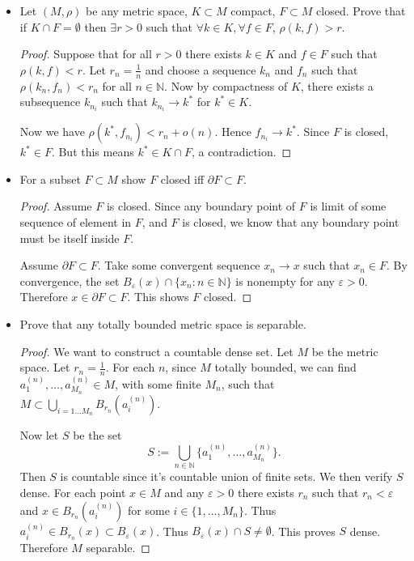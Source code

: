 \begin{itemize}
\item Let $(M, \rho)$ be any metric space, $K \subset M$ compact, $F \subset M$ closed. Prove that if $K \cap F = \emptyset $ then $\exists  r > 0$ such that  $\forall k \in K, \forall f \in F$, $\rho(k, f) > r$.
\begin{proof}
	Suppose that for all $r > 0$ there exists $k \in K$ and $f \in F$ such that $\rho(k, f) < r$. Let $r_n = \frac{1}{n}$ and choose a sequence $k_n$ and $f_n$ such that $\rho(k_n, f_n) < r_n$ for all $n \in \mathbb{N}$. Now by compactness of $K$, there exists a subsequence $k_{n_i}$ such that $k_{n_i} \to k^*$ for $k^* \in K$. 
 
	Now we have $\rho(k^*, f_{n_i}) < r_n + o(n)$. Hence $f_{n_i} \to  k^*$. Since $F$ is closed, $k^* \in F$. But this means  $k^* \in K \cap F$, a contradiction.
\end{proof}
\item For a subset $F \subset M$ show $F$ closed iff $\partial F \subset F$.
\begin{proof}
	Assume $F$ is closed. Since any boundary point of $F$ is limit of some sequence of element in $F$, and $F$ is closed, we know that any boundary point must be itself inside $F$.

	Assume $\partial F \subset F$. Take some convergent sequence $x_n \to x$ such that $x_n \in F$. By convergence, the set $B_\varepsilon(x) \cap \{x_n : n \in \mathbb{N}\} $ is nonempty for any $\varepsilon >0$. Therefore $x \in \partial F \subset F$. This shows $F$ closed.
\end{proof}
\item Prove that any totally bounded metric space is separable.
\begin{proof}
	We want to construct a countable dense set. Let $M$ be the metric space. Let $r_n = \frac{1}{n}$. For each $n$, since $M$ totally bounded, we can find $a^{(n)}_{1}, \ldots, a^{(n)}_{M_n} \in M$, with some finite $M_n$, such that  $M \subset \bigcup_{i = 1 \ldots M_n} B_{r_n}(a^{(n)}_i)$. 

	Now let $S$ be the set
	\[
		S := \bigcup_{n \in \mathbb{N}} \{a^{(n)}_1, \ldots, a^{(n)}_{M_n}\}   
	.\] 
	Then $S$ is countable since it's countable union of finite sets. We then verify $S$ dense. For each point $x \in M$ and any $\varepsilon >0$ there exists $r_n$ such that $r_n < \varepsilon$ and $x \in B_{r_n}(a^{(n)}_i)$ for some $i \in \{1, \ldots, M_n\} $. Thus $a^{(n)}_i \in B_{r_n}(x) \subset B_\varepsilon(x)$. Thus $B_\varepsilon(x) \cap  S \neq \emptyset $. This proves $S$ dense. Therefore $M$ separable.
\end{proof}




\end{itemize}
